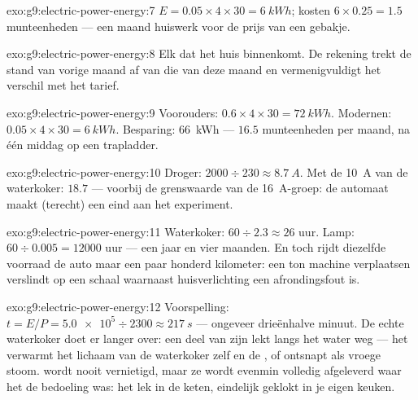 \begin{solution}{exo:g9:electric-power-energy:7}
$E = 0.05 \times 4 \times 30 = \qty{6}{kWh}$; kosten $6 \times 0.25 =
1.5$ munteenheden --- een maand huiswerk voor de prijs van een
gebakje.
\end{solution}

\begin{solution}{exo:g9:electric-power-energy:8}
Elk  dat het huis binnenkomt. De rekening trekt de
stand van vorige maand af van die van deze maand en vermenigvuldigt het
verschil met het tarief.
\end{solution}

\begin{solution}{exo:g9:electric-power-energy:9}
Voorouders: $0.6 \times 4 \times 30 = \qty{72}{kWh}$. Modernen: $0.05
\times 4 \times 30 = \qty{6}{kWh}$. Besparing: \qty{66}{kWh} --- $16.5$
munteenheden per maand, na één middag op een trapladder.
\end{solution}

\begin{solution}{exo:g9:electric-power-energy:10}
Droger: $2000 \div 230 \approx \qty{8.7}{A}$. Met de \qty{10}{A} van de
waterkoker: $18.7$ --- voorbij de grenswaarde van de
\qty{16}{A}-groep: de automaat maakt (terecht) een eind aan het
experiment.
\end{solution}

\begin{solution}{exo:g9:electric-power-energy:11}
Waterkoker: $60 \div 2.3 \approx 26$ uur. Lamp: $60 \div 0.005 =
12000$ uur --- een jaar en vier maanden. En toch rijdt diezelfde
voorraad de auto maar een paar honderd kilometer: een ton machine
verplaatsen verslindt  op een schaal waarnaast
huisverlichting een afrondingsfout is.
\end{solution}

\begin{solution}{exo:g9:electric-power-energy:12}
Voorspelling: $t = E/P = \num{5.0e5} \div 2300 \approx \qty{217}{s}$
--- ongeveer drieënhalve minuut. De echte waterkoker doet er langer
over: een deel van zijn  lekt langs het water weg --- het
verwarmt het lichaam van de waterkoker zelf en de , of
ontsnapt als vroege stoom.  wordt nooit vernietigd, maar
ze wordt evenmin volledig afgeleverd waar het de bedoeling was: het lek
in de keten, eindelijk geklokt in je eigen keuken.
\end{solution}

